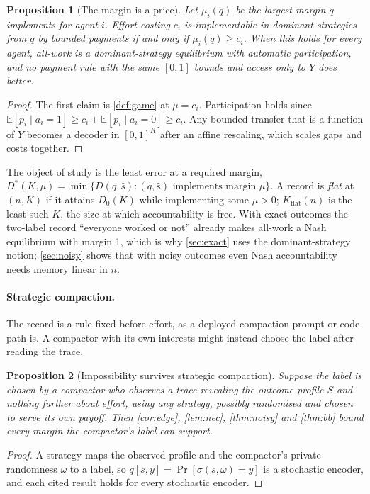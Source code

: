 \documentclass[sigconf,anonymous,acmthm=false]{aamas}
\theoremstyle{acmplain}
\newtheorem{proposition}{Proposition}
\theoremstyle{acmdefinition}
\newcommand{\E}{\mathbb{E}}
\newcommand{\Kflat}{K_{\mathrm{flat}}}
\newcommand{\shat}{\hat{s}}
\begin{document}
\begin{proposition}[The margin is a price]\label{prop:threshold}
Let $\mu_i(q)$ be the largest margin $q$ implements for agent $i$. Effort costing $c_i$ is
implementable in dominant strategies from $q$ by bounded payments if and only if $\mu_i(q)\ge c_i$. When
this holds for every agent, all-work is a dominant-strategy equilibrium with automatic participation,
and no payment rule with the same $[0,1]$ bounds and access only to $Y$ does better.
\end{proposition}
\begin{proof}
The first claim is \cref{def:game} at $\mu=c_i$. Participation holds since
$\E[p_i\mid a_i=1]\ge c_i+\E[p_i\mid a_i=0]\ge c_i$. Any bounded transfer that is a function
of $Y$ becomes a decoder in $[0,1]^K$ after an affine rescaling, which scales gaps and costs
together.
\end{proof}

The object of study is the least error at a required margin,
$D^*(K,\mu)=\min\{D(q,\shat):(q,\shat)\text{ implements margin }\mu\}$. A record is
\emph{flat} at $(n,K)$ if it attains $D_0(K)$ while implementing some $\mu>0$; $\Kflat(n)$ is
the least such $K$, the size at which accountability is free. With exact outcomes the
two-label record ``everyone worked or not'' already makes all-work a Nash equilibrium with
margin 1, which is why \cref{sec:exact} uses the dominant-strategy notion; \cref{sec:noisy} shows
that with noisy outcomes even Nash accountability needs memory linear in $n$.

\paragraph{Strategic compaction.} The record is a rule fixed before effort, as a deployed
compaction prompt or code path is. A compactor with its own interests might instead choose
the label after reading the trace.

\begin{proposition}[Impossibility survives strategic compaction]\label{prop:strategic}
Suppose the label is chosen by a compactor who observes a trace revealing the outcome profile
$S$ and nothing further about effort, using any strategy, possibly randomised and chosen to
serve its own payoff. Then \cref{cor:edge}, \cref{lem:nec}, \cref{thm:noisy} and
\cref{thm:bb} bound every margin the compactor's label can support.
\end{proposition}
\begin{proof}
A strategy maps the observed profile and the compactor's private randomness $\omega$ to a
label, so $q[s,y]=\Pr[\sigma(s,\omega)=y]$ is a stochastic encoder, and each cited result
holds for every stochastic encoder.
\end{proof}
\end{document}
